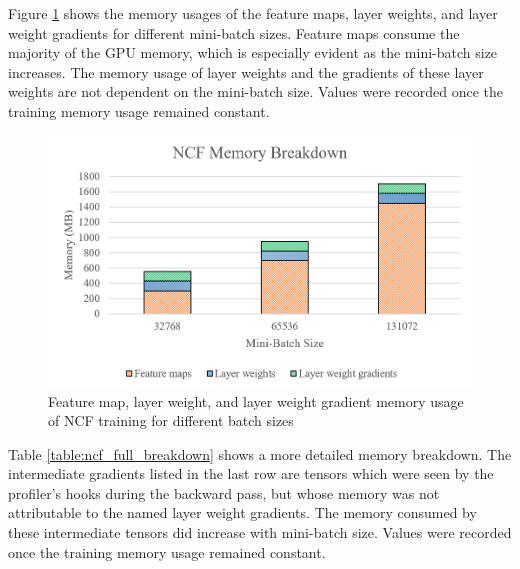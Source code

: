 \documentclass[12pt,letterpaper]{article}
\begin{document}
Figure \ref{fig:recommendation_bar_graph} shows the memory usages of the feature maps, layer weights, and layer weight gradients for different mini-batch sizes. Feature maps consume the majority of the GPU memory, which is especially evident as the mini-batch size increases. The memory usage of layer weights and the gradients of these layer weights are not dependent on the mini-batch size. Values were recorded once the training memory usage remained constant.
\begin{figure}[H]
\centering
\includegraphics[width=1.0\textwidth]{recommendation_bar_graphs.PNG}
\captionsetup{width=0.8\linewidth}
\caption{Feature map, layer weight, and layer weight gradient memory usage of NCF training for different batch sizes}
\label{fig:recommendation_bar_graph}
\end{figure}

 Table \ref{table:ncf_full_breakdown} shows a more detailed memory breakdown. The intermediate gradients listed in the last row are tensors which were seen by the profiler's hooks during the backward pass, but whose memory was not attributable to the named layer weight gradients. The memory consumed by these intermediate tensors did increase with mini-batch size. Values were recorded once the training memory usage remained constant.
\end{document}
